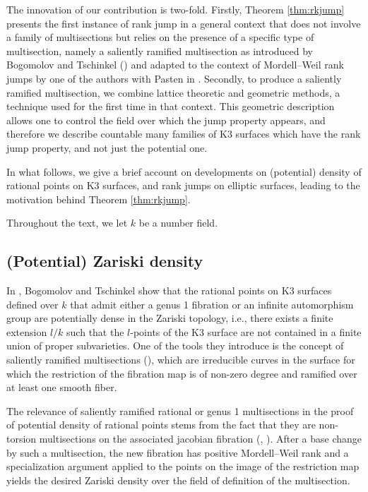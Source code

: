 \documentclass{amsart}
\theoremstyle{definition}
\numberwithin{equation}{section}
\begin{document}
The innovation of our contribution is two-fold. Firstly, Theorem \ref{thm:rkjump} presents the first instance of rank jump in a general context that does not involve a family of multisections but relies on the presence of a specific type of multisection, namely a saliently ramified multisection as introduced by Bogomolov and Tschinkel (\cite[Definition 2.3]{BT2000}) and adapted to the context of Mordell--Weil rank jumps by one of the authors with Pasten in \cite{PastenSalgado}. Secondly, to produce a saliently ramified multisection, we combine lattice theoretic and geometric methods, a technique used for the first time in that context. This geometric description allows one to control the field over which the jump property appears, and therefore we describe countable many families of K3 surfaces which have the rank jump property, and not just the potential one.


In what follows, we give a brief account on developments on (potential) density of rational points on K3 surfaces, and rank jumps on elliptic surfaces, leading to the motivation behind Theorem \ref{thm:rkjump}.

Throughout the text, we let $k$ be a number field.

\subsection*{(Potential) Zariski density} 
In \cite[Theorem 1.1]{BT}, Bogomolov and Tschinkel show that the rational points on K3 surfaces defined over $k$ that admit either a genus 1 fibration or an infinite automorphism group are potentially dense in the Zariski topology, i.e., there exists a finite extension $l/k$ such that the $l$-points of the K3 surface are not contained in a finite union of proper subvarieties. One of the tools they introduce is the concept of saliently ramified multisections (\cite[Definition 2.3]{BT2000}), which are irreducible curves in the surface for which the restriction of the fibration map is of non-zero degree and ramified over at least one smooth fiber.

The relevance of saliently ramified rational or genus 1 multisections in the proof of potential density of rational points stems from the fact that they are non-torsion multisections on the associated jacobian fibration (\cite[Proposition 4.4]{BT}, \cite[Proposition 2.4]{BT2000}). After a base change by such a multisection, the new fibration has positive Mordell--Weil rank and a specialization argument applied to the points on the image of the restriction map yields the desired Zariski density over the field of definition of the multisection. 
\end{document}
